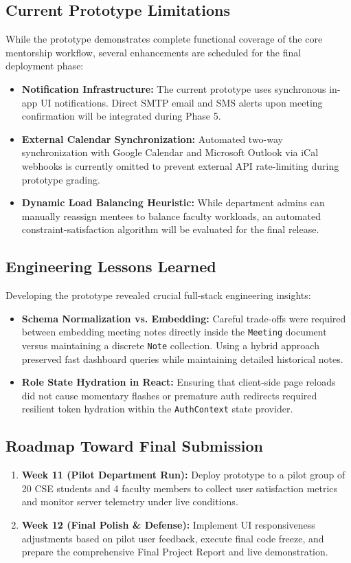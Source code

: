 \documentclass[11pt,a4paper]{article}
\begin{document}
\subsection{Current Prototype Limitations}
While the prototype demonstrates complete functional coverage of the core mentorship workflow, several enhancements are scheduled for the final deployment phase:
\begin{itemize}[leftmargin=1.4em, itemsep=0.2em]
  \item \textbf{Notification Infrastructure:} The current prototype uses synchronous in-app UI notifications. Direct SMTP email and SMS alerts upon meeting confirmation will be integrated during Phase 5.
  \item \textbf{External Calendar Synchronization:} Automated two-way synchronization with Google Calendar and Microsoft Outlook via iCal webhooks is currently omitted to prevent external API rate-limiting during prototype grading.
  \item \textbf{Dynamic Load Balancing Heuristic:} While department admins can manually reassign mentees to balance faculty workloads, an automated constraint-satisfaction algorithm will be evaluated for the final release.
\end{itemize}

\subsection{Engineering Lessons Learned}
Developing the prototype revealed crucial full-stack engineering insights:
\begin{itemize}[leftmargin=1.4em, itemsep=0.2em]
  \item \textbf{Schema Normalization vs. Embedding:} Careful trade-offs were required between embedding meeting notes directly inside the \texttt{Meeting} document versus maintaining a discrete \texttt{Note} collection. Using a hybrid approach preserved fast dashboard queries while maintaining detailed historical notes.
  \item \textbf{Role State Hydration in React:} Ensuring that client-side page reloads did not cause momentary flashes or premature auth redirects required resilient token hydration within the \texttt{AuthContext} state provider.
\end{itemize}

\subsection{Roadmap Toward Final Submission}
\begin{enumerate}[leftmargin=1.4em, itemsep=0.2em]
  \item \textbf{Week 11 (Pilot Department Run):} Deploy prototype to a pilot group of 20 CSE students and 4 faculty members to collect user satisfaction metrics and monitor server telemetry under live conditions.
  \item \textbf{Week 12 (Final Polish \& Defense):} Implement UI responsiveness adjustments based on pilot user feedback, execute final code freeze, and prepare the comprehensive Final Project Report and live demonstration.
\end{enumerate}
\end{document}
